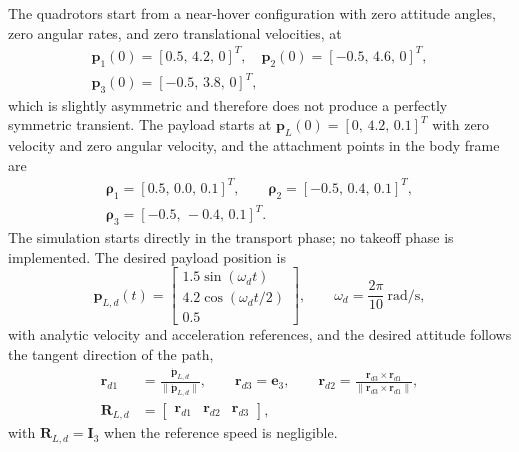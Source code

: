 \documentclass[Review,sageh,times]{sagej}
\begin{document}
The quadrotors start from a near-hover configuration with zero attitude angles,
zero angular rates, and zero translational velocities, at
\begin{equation}
\begin{gathered}
\mathbf{p}_1(0) = [0.5,\,4.2,\,0]^{T},\quad
\mathbf{p}_2(0) = [-0.5,\,4.6,\,0]^{T},\\
\mathbf{p}_3(0) = [-0.5,\,3.8,\,0]^{T},
\end{gathered}
\label{eq:pinit}
\end{equation}
which is slightly asymmetric and therefore does not produce a perfectly
symmetric transient. The payload starts at
$\mathbf{p}_L(0)=[0,\,4.2,\,0.1]^{T}$ with zero velocity and zero angular
velocity, and the attachment points in the body frame are
\begin{equation}
\begin{gathered}
\boldsymbol{\rho}_1 = [0.5,\,0.0,\,0.1]^{T},\qquad
\boldsymbol{\rho}_2 = [-0.5,\,0.4,\,0.1]^{T},\\
\boldsymbol{\rho}_3 = [-0.5,\,-0.4,\,0.1]^{T}.
\end{gathered}
\label{eq:rho}
\end{equation}
The simulation starts directly in the transport phase; no takeoff phase is
implemented. The desired payload position is
\begin{equation}
\mathbf{p}_{L,d}(t) =
\begin{bmatrix}
1.5\sin(\omega_d t)\\
4.2\cos(\omega_d t/2)\\
0.5
\end{bmatrix},
\qquad
\omega_d = \frac{2\pi}{10}~\mathrm{rad/s},
\label{eq:traj}
\end{equation}
with analytic velocity and acceleration references, and the desired attitude
follows the tangent direction of the path,
\begin{equation}
\begin{aligned}
\mathbf{r}_{d1} &= \frac{\dot{\mathbf{p}}_{L,d}}{\|\dot{\mathbf{p}}_{L,d}\|},
\qquad
\mathbf{r}_{d3} = \mathbf{e}_3,
\qquad
\mathbf{r}_{d2} = \frac{\mathbf{r}_{d3}\times\mathbf{r}_{d1}}{\|\mathbf{r}_{d3}\times\mathbf{r}_{d1}\|},\\
\mathbf{R}_{L,d} &=
\begin{bmatrix}
\mathbf{r}_{d1} & \mathbf{r}_{d2} & \mathbf{r}_{d3}
\end{bmatrix},
\end{aligned}
\label{eq:RLd}
\end{equation}
with $\mathbf{R}_{L,d}=\mathbf{I}_3$ when the reference speed is negligible.
\end{document}

